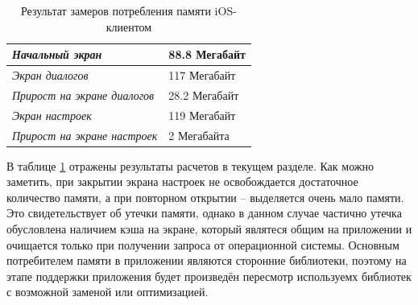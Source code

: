 \begin{table}[h!]
\caption{Результат замеров потребления памяти iOS-клиентом}
\label{sec:eng:memory:result}
\centering
\begin{tabularx}{\textwidth}{ |X|X| } 
 \hline
 \emph{Начальный экран} & \num{88.8} Мегабайт \\ 
 \hline
 \emph{Экран диалогов} & \num{117} Мегабайт \\ 
 \hline
 \emph{Прирост на экране диалогов} & \num{28.2} Мегабайт \\ 
 \hline
 \emph{Экран настроек} & \num{119} Мегабайт \\ 
 \hline
 \emph{Прирост на экране настроек} & \num{2} Мегабайта \\ 
 \hline
\end{tabularx}
\end{table}

В таблице \ref{sec:eng:memory:result} отражены результаты расчетов в текущем разделе. Как можно заметить, при закрытии экрана настроек не освобождается достаточное количество памяти, а при повторном открытии -- выделяется очень мало памяти. Это свидетельствует об утечки памяти, однако в данном случае частично утечка обусловлена наличием кэша на экране, который являтеся общим на приложении и очищается только при получении запроса от операционной системы. Основным потребителем памяти в приложении являются сторонние библиотеки, поэтому на этапе поддержки приложения будет произведён пересмотр используемх библиотек с возможной заменой или оптимизацией.